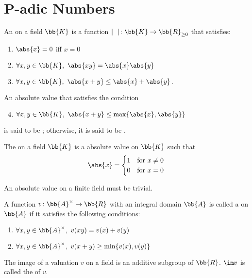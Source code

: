 \section{P-adic Numbers}\cite{gouvea}
An  on a field $\bb{K}$ is a function $\mid \ \ \mid \colon \bb{K} \to \bb{R}_{\ge0}$ that satisfies:
\begin{enumerate}
\item $\abs{x} = 0$ iff $x = 0$
\item $\forall x, y \in \bb{K},\ \abs{xy} = \abs{x}\abs{y}$
\item $\forall x, y \in \bb{K},\ \abs{x+y} \le \abs{x}+\abs{y}$.
\end{enumerate}

An absolute value that satisfies the condition
\begin{enumerate}
\setcounter{enumi}{3}
\item $\forall x, y \in \bb{K},\ \abs{x+y} \le \max \{ \abs{x},\abs{y} \}$
\end{enumerate}
is said to be ; otherwise, it is said to be .

The  on a field $\bb{K}$ is a absolute value on $\bb{K}$ such that
\[
\abs{x} = \begin{cases}
 1 & \text{for}\ x \neq 0 \\
 0 & \text{for}\ x = 0
 \end{cases}
\]

An absolute value on a finite field must be trivial.

A function $v \colon \bb{A}^\times \to \bb{R}$ with an integral domain $\bb{A}$ is called a  on $\bb{A}$ if it satisfies the following conditions:
\begin{enumerate}
\item $\forall x, y \in \bb{A}^\times,\ v(xy) = v(x) + v(y)$
\item $\forall x, y \in \bb{A}^\times,\ v(x+y) \ge \min \{ v(x), v(y) \}$
\end{enumerate}

The image of a valuation $v$ on a field is an additive subgroup of $\bb{R}$. $\im v$ is called the  of $v$.

